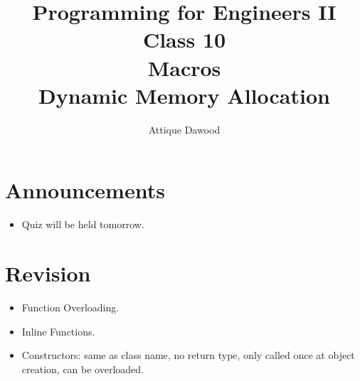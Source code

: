 \documentclass[12pt,a4paper]{article}
\title{\vspace{-2cm}Programming for Engineers II\\Class 10\\Macros\\Dynamic Memory Allocation}
\author{Attique Dawood}
\begin{document}
\maketitle
\section{Announcements}
\begin{itemize}
\item Quiz will be held tomorrow.
\end{itemize}
\section{Revision}
\begin{itemize}
\item Function Overloading.
\item Inline Functions.
\item Constructors: same as class name, no return type, only called once at object creation, can be overloaded.
\end{itemize}
\end{document}
